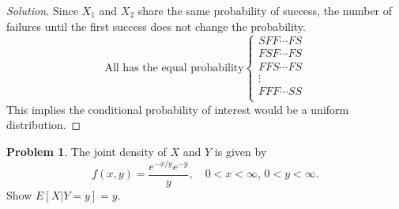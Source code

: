 \documentclass[10pt]{article}
\theoremstyle{definition}
\newtheorem{problem}{Problem}
\begin{document}
\begin{proof}[Solution]
Since $X_1$ and $X_2$ share the same probability of success, the number of failures until the first success does not change the probability.
\begin{equation*}
\mbox{All has the equal probability}
\begin{cases}
 SFF\cdots FS\\
 FSF\cdots FS\\
 FFS\cdots FS\\
 \vdots \\
 FFF\cdots SS\\
\end{cases}
\end{equation*}
This implies the conditional probability of interest would be a uniform distribution.
\end{proof}








\begin{problem}
The joint density of $X$ and $Y$ is given by
\[
f (x,y) = \frac{e^{-x/y}e^{-y}}{y}, \quad 0 < x < \infty,\, 0 < y < \infty.
\]
Show $E[X|Y = y] = y$.
\end{problem}
\end{document}
